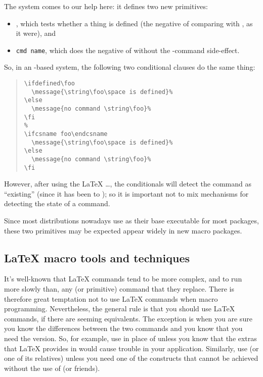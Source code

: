 The  system comes to our help here: it
defines two new primitives:
\begin{itemize}
\item {}, which tests whether a thing is defined (the
  negative of comparing with , as it were), and
\item {} \texttt{cmd name}, which does the
  negative of  without the -command
  side-effect.
\end{itemize}
So, in an \eTeX{}-based system, the following two conditional clauses do
the same thing:
\begin{quote}
\begin{verbatim}
\ifdefined\foo
  \message{\string\foo\space is defined}%
\else
  \message{no command \string\foo}%
\fi
%
\ifcsname foo\endcsname
  \message{\string\foo\space is defined}%
\else
  \message{no command \string\foo}%
\fi
\end{verbatim}
\end{quote}
However, after using the \LaTeX{}
\dots{}, the conditionals will detect the
command as ``existing'' (since it has been  to );
so it is important not to mix mechanisms for detecting the state of a
command.

Since most distributions nowadays use \eTeX{} as their base executable
for most packages, these two primitives may be expected appear widely
in new macro packages.

\subsection{\LaTeX{} macro tools and techniques}


It's well-known that \LaTeX{} commands tend to be more complex, and to
run more slowly than, any \plaintex{} (or primitive) command that they
replace.  There is therefore great temptation not to use \LaTeX{}
commands when macro programming.  Nevertheless, the general rule is
that you should use \LaTeX{} commands, if there are seeming
equivalents.  The exception is when you are sure you know the
differences between the two commands and you know that you need the
\plaintex{} version.  So, for example, use  in place of 
unless you know that the extras that \LaTeX{} provides in 
would cause trouble in your application.  Similarly, use
 (or one of its relatives) unless you need one of the
constructs that cannot be achieved without the use of  (or friends).

